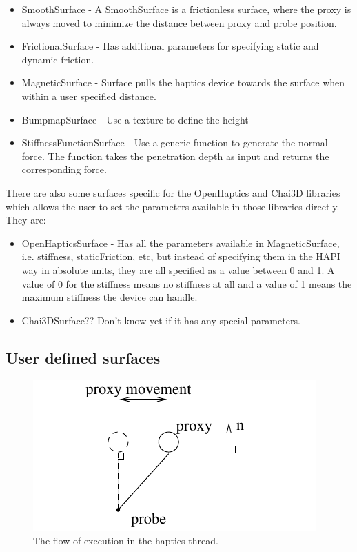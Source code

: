 \begin{itemize}
\item SmoothSurface - A SmoothSurface is a frictionless surface, where
  the proxy is always moved to minimize the distance between proxy and
  probe position. 
\item FrictionalSurface - Has additional parameters for specifying
  static and dynamic friction.
\item MagneticSurface - Surface pulls the haptics device towards the
  surface when within a user specified distance.
\item BumpmapSurface - Use a texture to define the height 
\item StiffnessFunctionSurface - Use a generic function to generate
  the normal force. The function takes the penetration depth as input
  and returns the corresponding force. 
\end{itemize}

There are also some surfaces specific for the OpenHaptics and Chai3D
libraries which allows the user to set the parameters available in
those libraries directly. They are:
\begin{itemize}
\item OpenHapticsSurface - Has all the parameters available in
  MagneticSurface, i.e. stiffness, staticFriction, etc, but instead of
  specifying them in the HAPI way in absolute units, they are all
  specified as a value between 0 and 1. A value of 0 for the stiffness
  means no stiffness at all and a value of 1 means the maximum
  stiffness the device can handle.
\item Chai3DSurface?? Don't know yet if it has any special parameters.
\end{itemize}

\subsection{User defined surfaces}

\begin{figure} 
  \centering 
  \includegraphics{images/surface.pdf}
  \caption{The flow of execution in the haptics thread.}
  \label{haptics thread} 
\end{figure}

